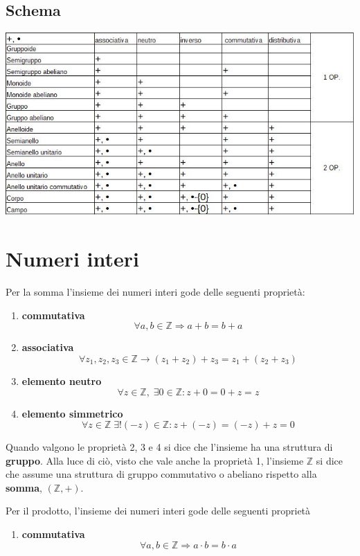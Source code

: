 \begin{flushleft}
\subsection{Schema}
    \includegraphics[scale=1]{strutture_algebriche.jpg}

\section{Numeri interi}
Per la somma l'insieme dei numeri interi gode delle seguenti proprietà:
\begin{enumerate}
    \item \textbf{commutativa}
    \[\forall a,b \in \mathbb{Z} \Rightarrow a+b =  b + a\]
    
    \item \textbf{associativa} \[\forall z_1,z_2,z_3 \in \mathbb{Z}\rightarrow (z_1 + z_2) + z_3 = z_1 + (z_2 + z_3)\]
    
    \item \textbf{elemento neutro} \[\forall z \in \mathbb{Z},\;\exists0\in \mathbb{Z}:z+0=0+z=z\]
    
    \item \textbf{elemento simmetrico} \[\forall z \in \mathbb{Z}\;\exists!(-z)\in\mathbb{Z}:z+(-z) = (-z) + z = 0\]
\end{enumerate}
Quando valgono le proprietà 2, 3 e 4 si dice che l'insieme ha una struttura di \textbf{gruppo}.
Alla luce di ciò, visto che vale anche la proprietà 1, l'insieme $\mathbb{Z}$ si dice che assume una struttura di gruppo commutativo o abeliano rispetto alla \textbf{somma}, $(\mathbb{Z}, +)$.

Per il prodotto, l'insieme dei numeri interi gode delle seguenti proprietà 

\begin{enumerate}
    \item \textbf{commutativa}
    \[\forall a,b \in \mathbb{Z} \Rightarrow a\cdot b =  b \cdot a\]
    

\end{enumerate}
\end{flushleft}
